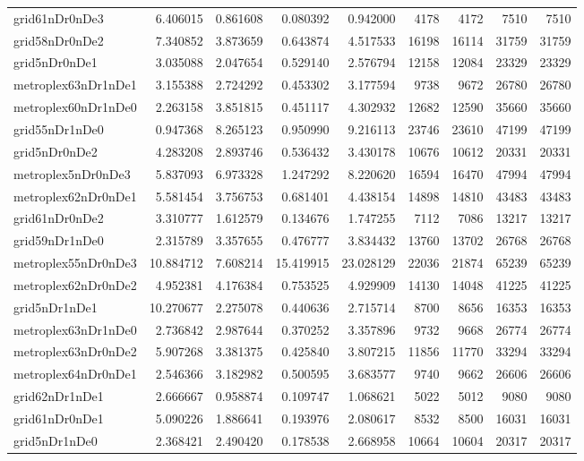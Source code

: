 \begin{longtable}{|l|r|r|r|r|r|r|r|r|}
grid61nDr0nDe3 & 6.406015 & 0.861608 & 0.080392 & 0.942000 & 4178 & 4172 & 7510 & 7510 \\
grid58nDr0nDe2 & 7.340852 & 3.873659 & 0.643874 & 4.517533 & 16198 & 16114 & 31759 & 31759 \\
grid5nDr0nDe1 & 3.035088 & 2.047654 & 0.529140 & 2.576794 & 12158 & 12084 & 23329 & 23329 \\
metroplex63nDr1nDe1 & 3.155388 & 2.724292 & 0.453302 & 3.177594 & 9738 & 9672 & 26780 & 26780 \\
metroplex60nDr1nDe0 & 2.263158 & 3.851815 & 0.451117 & 4.302932 & 12682 & 12590 & 35660 & 35660 \\
grid55nDr1nDe0 & 0.947368 & 8.265123 & 0.950990 & 9.216113 & 23746 & 23610 & 47199 & 47199 \\
grid5nDr0nDe2 & 4.283208 & 2.893746 & 0.536432 & 3.430178 & 10676 & 10612 & 20331 & 20331 \\
metroplex5nDr0nDe3 & 5.837093 & 6.973328 & 1.247292 & 8.220620 & 16594 & 16470 & 47994 & 47994 \\
metroplex62nDr0nDe1 & 5.581454 & 3.756753 & 0.681401 & 4.438154 & 14898 & 14810 & 43483 & 43483 \\
grid61nDr0nDe2 & 3.310777 & 1.612579 & 0.134676 & 1.747255 & 7112 & 7086 & 13217 & 13217 \\
grid59nDr1nDe0 & 2.315789 & 3.357655 & 0.476777 & 3.834432 & 13760 & 13702 & 26768 & 26768 \\
metroplex55nDr0nDe3 & 10.884712 & 7.608214 & 15.419915 & 23.028129 & 22036 & 21874 & 65239 & 65239 \\
metroplex62nDr0nDe2 & 4.952381 & 4.176384 & 0.753525 & 4.929909 & 14130 & 14048 & 41225 & 41225 \\
grid5nDr1nDe1 & 10.270677 & 2.275078 & 0.440636 & 2.715714 & 8700 & 8656 & 16353 & 16353 \\
metroplex63nDr1nDe0 & 2.736842 & 2.987644 & 0.370252 & 3.357896 & 9732 & 9668 & 26774 & 26774 \\
metroplex63nDr0nDe2 & 5.907268 & 3.381375 & 0.425840 & 3.807215 & 11856 & 11770 & 33294 & 33294 \\
metroplex64nDr0nDe1 & 2.546366 & 3.182982 & 0.500595 & 3.683577 & 9740 & 9662 & 26606 & 26606 \\
grid62nDr1nDe1 & 2.666667 & 0.958874 & 0.109747 & 1.068621 & 5022 & 5012 & 9080 & 9080 \\
grid61nDr0nDe1 & 5.090226 & 1.886641 & 0.193976 & 2.080617 & 8532 & 8500 & 16031 & 16031 \\
grid5nDr1nDe0 & 2.368421 & 2.490420 & 0.178538 & 2.668958 & 10664 & 10604 & 20317 & 20317 \\

\end{longtable}
